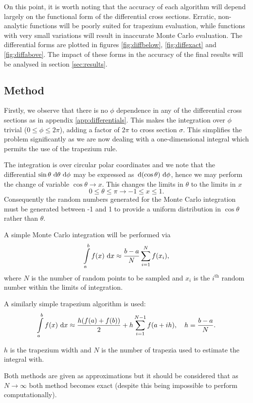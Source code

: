 \documentclass[]{article}
\begin{document}
On this point, it is worth noting that the accuracy of each algorithm will depend largely on the functional form of the differential cross sections. Erratic, non-analytic functions will be poorly suited for trapezium evaluation, while functions with very small variations will result in inaccurate Monte Carlo evaluation. The differential forms are plotted in figures \ref{fig:diffbelow}, \ref{fig:diffexact} and \ref{fig:diffabove}. The impact of these forms in the accuracy of the final results will be analysed in section \ref{sec:results}.

\subsection{Method}\label{ssec:method}

Firstly, we observe that there is no $\phi$ dependence in any of the differential cross sections as in appendix \ref{app:differentials}. This makes the integration over $\phi$ trivial ($0\leq\phi\leq2\pi$), adding a factor of $2\pi$ to cross section $\sigma$. This simplifies the problem significantly as we are now dealing with a one-dimensional integral which permits the use of the trapezium rule.

The integration is over circular polar coordinates and we note that the differential $\sin{\theta}\,\operatorname{d}\!{\theta}\,\operatorname{d}\!{\phi}$ may be expressed as $\,\operatorname{d}\!{(\cos{\theta})}\,\operatorname{d}\!{\phi}$, hence we may perform the change of variable $\cos{\theta} \to x$. This changes the limits in $\theta$ to the limits in $x$ $$0 \leq \theta \leq \pi \to -1 \leq x \leq 1.$$ Consequently the random numbers generated for the Monte Carlo integration must be generated between -1 and 1 to provide a uniform distribution in $\cos{\theta}$ rather than $\theta$.

A simple Monte Carlo integration will be performed via $$\int\limits_{a}^{b}f(x)\,\operatorname{d}\!{x} \approx \frac{b-a}{N}\sum\limits_{i=1}^{N}f(x_{i}),$$ where $N$ is the number of random points to be sampled and $x_{i}$ is the $i^{\mathrm{th}}$ random number within the limits of integration.

A similarly simple trapezium algorithm is used: $$\int\limits_{a}^{b}f(x)\,\operatorname{d}\!{x} \approx \frac{h(f(a) + f(b))}{2} + h\sum\limits_{i=1}^{N-1}f(a+ih),\quad h=\frac{b-a}{N}.$$

$h$ is the trapezium width and $N$ is the number of trapezia used to estimate the integral with.

Both methods are given as approximations but it should be considered that as $N \to \infty$ both method becomes exact (despite this being impossible to perform computationally).
\end{document}
